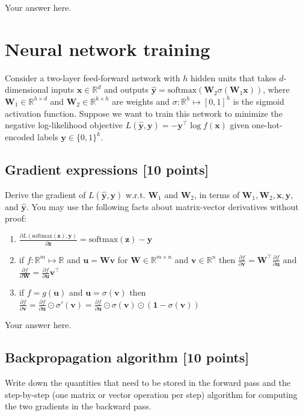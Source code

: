 \documentclass[a4paper]{article}
\theoremstyle{definition}
\newcommand{\R}{\mathbb R}
\def\*#1{\mathbf{#1}}
\begin{document}
{\color{blue} Your answer here.}

\newpage
\section{Neural network training}\label{sec:training}

Consider a two-layer feed-forward network with $h$ hidden units that takes $d$-dimensional inputs $\*x\in\R^d$ and outputs $\*{\hat y}=\textrm{softmax}(\*W_2\sigma(\*W_1\*x))$,
where $\*W_1\in\R^{h\times d}$ and $\*W_2\in\R^{k\times h}$ are weights and $\sigma:\R^h\mapsto[0,1]^h$ is the sigmoid activation function.
Suppose we want to train this network to minimize the negative log-likelihood objective $L(\*{\hat y},\*y)=-\*y^\top\log f(\*x)$ given one-hot-encoded labels $\*y\in\{0,1\}^k$.

\subsection{Gradient expressions [10 points]}
Derive the gradient of $L(\*{\hat y},\*y)$ w.r.t. $\*W_1$ and $\*W_2$, in terms of $\*W_1,\*W_2,\*x,\*y$, and $\*{\hat y}$.
You may use the following facts about matrix-vector derivatives without proof:
\begin{enumerate}
	\item $\frac{\partial L(\textrm{softmax}(\*z),\*y)}{\partial\*z}=\textrm{softmax}(\*z)-\*y$
	\item if $f:\R^m\mapsto\R$ and $\*u=\*W\*v$ for $\*W\in\R^{m\times n}$ and $\*v\in\R^n$ then $\frac{\partial f}{\partial\*v}=\*W^\top\frac{\partial f}{\partial\*u}$ and $\frac{\partial f}{\partial \*W}=\frac{\partial f}{\partial\*u}\*v^\top$
	\item if $f=g(\*u)$ and $\*u=\sigma(\*v)$ then $\frac{\partial f}{\partial\*v}=\frac{\partial f}{\partial\*u}\odot\sigma'(\*v)=\frac{\partial f}{\partial\*u}\odot\sigma(\*v)\odot(\*1-\sigma(\*v))$
\end{enumerate}

{\color{blue} Your answer here.}

\subsection{Backpropagation algorithm [10 points]}
Write down the quantities that need to be stored in the forward pass and the step-by-step (one matrix or vector operation per step) algorithm for computing the two gradients in the backward pass.
\end{document}
